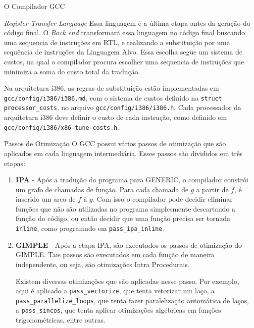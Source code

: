 \begin{section}{O Compilador GCC}
\begin{subsection}{\textit{Register Transfer Language}}
    Essa linguagem é a última etapa antes da geração do código final. O
\textit{Back end} transformará essa linguagem no código final buscando
uma sequencia de instruções em RTL, e realizando a substituição por uma
sequência de instruções da Linguagem Alvo. Essa escolha segue um sistema
de custos, na qual o compilador procura escolher uma sequencia de instruções
que minimiza a soma do custo total da tradução.

    Na arquitetura i386, as regras de substituição estão implementadas
em \texttt{gcc/config/i386/i386.md}, com o sistema de custos definido
na \texttt{struct processor\_costs}, no arquivo \texttt{gcc/config/i386/i386.h}.
Cada processador da arquitetura i386 deve definir o custo de cada instrução,
como definido em \texttt{gcc/config/i386/x86-tune-costs.h}.


\end{subsection}

\begin{subsection}{Passos de Otimização}
    O GCC possui vários passos de otimização que são aplicados em cada linguagem
intermediária. Esses passos são divididos em três etapas:

    \begin{enumerate}
        \item \textbf{IPA} - Após a tradução do programa para GENERIC, o
            compilador constrói um grafo de chamadas de função. Para cada
            chamada de $g$ a partir de $f$, é inserido um arco de $f$ à $g$.
            Com isso o compilador pode decidir eliminar funções que não são
            utilizadas no programa simplesmente descartando a função do
            código, ou então decidir que uma função precisa ser tornada
            \texttt{inline}, como programado em \texttt{pass\_ipa\_inline}.

        \item \textbf{GIMPLE} - Após a etapa IPA, são executados os passos
            de otimização do GIMPLE. Tais passos são executados em cada
            função de maneira independente, ou seja, são otimizações
            Intra Procedurais.

            Existem diversas otimizações que são aplicadas nesse passo.
            Por exemplo, aqui é aplicado a \texttt{pass\_vectorize},
            que tenta vetorizar um laço, a \texttt{pass\_parallelize\_loops},
            que tenta fazer paralelização automática de laços, a
            \texttt{pass\_sincos}, que tenta aplicar otimizações algébricas em
            funções trigonométricas, entre outras.


\end{enumerate}
\end{subsection}
\end{section}
